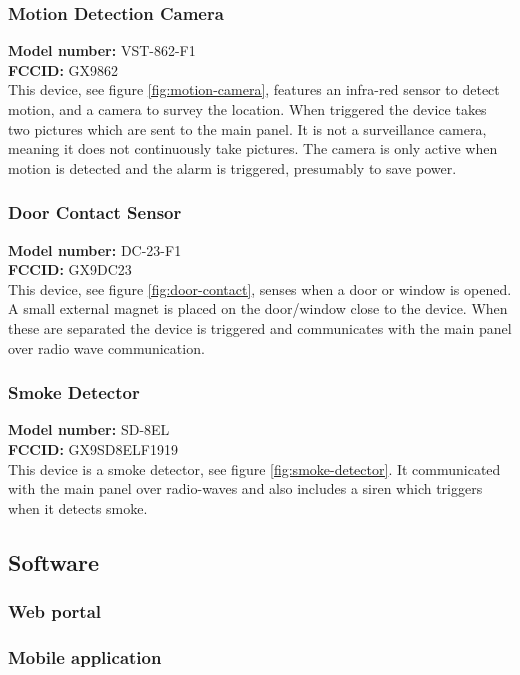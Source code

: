 \subsubsection{Motion Detection Camera}
\textbf{Model number:} VST-862-F1 \\
\textbf{FCCID:} GX9862 \\
This device, see figure \ref{fig:motion-camera}, features an infra-red sensor to detect motion, and a camera to survey the location. When triggered the device takes two pictures which are sent to the main panel. It is not a surveillance camera, meaning it does not continuously take pictures. The camera is only active when motion is detected and the alarm is triggered, presumably to save power.

\subsubsection{Door Contact Sensor}
\textbf{Model number:} DC-23-F1 \\
\textbf{FCCID:} GX9DC23 \\
This device, see figure \ref{fig:door-contact}, senses when a door or window is opened. A small external magnet is placed on the door/window close to the device. When these are separated the device is triggered and communicates with the main panel over radio wave communication.

\subsubsection{Smoke Detector}
\textbf{Model number:} SD-8EL \\
\textbf{FCCID:} GX9SD8ELF1919 \\
This device is a smoke detector, see figure \ref{fig:smoke-detector}. It communicated with the main panel over radio-waves and also includes a siren which triggers when it detects smoke.

\subsection{Software} \label{ch:system:software}
\subsubsection{Web portal}

\subsubsection{Mobile application}

